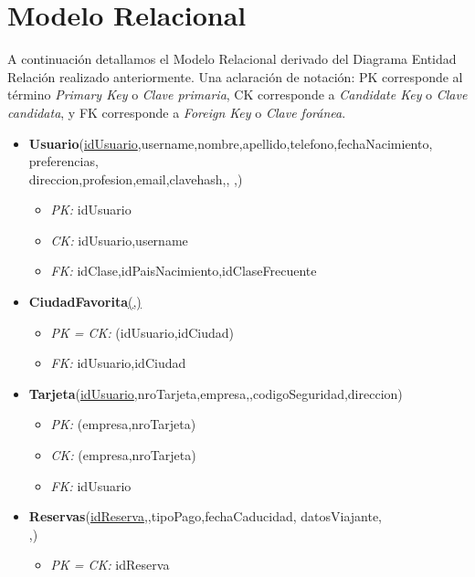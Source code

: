 \section{Modelo Relacional}

A continuaci\'on detallamos el Modelo Relacional derivado del
Diagrama Entidad Relaci\'on realizado anteriormente. Una aclaraci\'on
de notaci\'on: PK corresponde al t\'ermino \textit{Primary Key} o \textit{Clave primaria},
CK corresponde a \textit{Candidate Key} o \textit{Clave candidata}, y FK corresponde a
\textit{Foreign Key} o \textit{Clave for\'anea}.

\begin{itemize}
	\item \textbf{Usuario}(\underline{idUsuario},username,nombre,apellido,telefono,fechaNacimiento,
	preferencias,\\ direccion,profesion,email,clavehash,,
	,)
		\begin{itemize}
			\item \textit{PK:} idUsuario
			\item \textit{CK:} idUsuario,username
			\item \textit{FK:} idClase,idPaisNacimiento,idClaseFrecuente
		\end{itemize}
	\item \textbf{CiudadFavorita}\underline{(,)}
		\begin{itemize}
			\item \textit{PK = CK: } (idUsuario,idCiudad)
			\item \textit{FK:} idUsuario,idCiudad
		\end{itemize}
	\item \textbf{Tarjeta}(\underline{idUsuario},nroTarjeta,empresa,,codigoSeguridad,direccion)
		\begin{itemize}
			\item \textit{PK:} (empresa,nroTarjeta)
			\item \textit{CK:} (empresa,nroTarjeta)
			\item \textit{FK:} idUsuario
		\end{itemize}
	\item \textbf{Reservas}(\underline{idReserva},,tipoPago,fechaCaducidad, datosViajante,
		\\,)
		\begin{itemize}
			\item \textit{PK = CK:} idReserva

\end{itemize}
\end{itemize}
